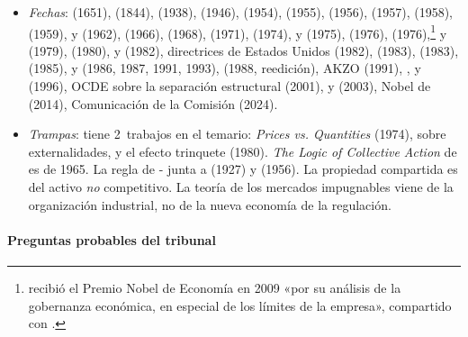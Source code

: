 \documentclass[11pt]{article}
\begin{document}
\begin{itemize}
\begin{itemize}
  \item \emph{Fechas}:  (1651),  (1844),  (1938),  (1946),  (1954),  (1955),  (1956),  (1957),  (1958),  (1959),  y  (1962),  (1966),  (1968),  (1971),  (1974),  y  (1975),  (1976),  (1976),\footnote{ recibió el Premio Nobel de Economía en 2009 «por su análisis de la gobernanza económica, en especial de los límites de la empresa», compartido con \nocite{Nobel2009OstromWilliamson}.}  y  (1979),  (1980),  y  (1982), directrices de Estados Unidos (1982),  (1983),  (1983),  (1985),  y  (1986, 1987, 1991, 1993),  (1988, reedición), AKZO (1991), ,  y  (1996), OCDE sobre la separación estructural (2001),  y  (2003), Nobel de  (2014), Comunicación de la Comisión (2024).
  \item \emph{Trampas}:  tiene 2~trabajos en el temario: \emph{Prices vs. Quantities} (1974), sobre externalidades, y el efecto trinquete (1980). \emph{The Logic of Collective Action} de  es de 1965. La regla de - junta a  (1927) y  (1956). La propiedad compartida es del activo \emph{no} competitivo. La teoría de los mercados impugnables viene de la organización industrial\nocite{BaumolPanzarWillig1982Contestable}, no de la nueva economía de la regulación.
  \end{itemize}
\end{itemize}

\paragraph{Preguntas probables del tribunal}
\end{document}
